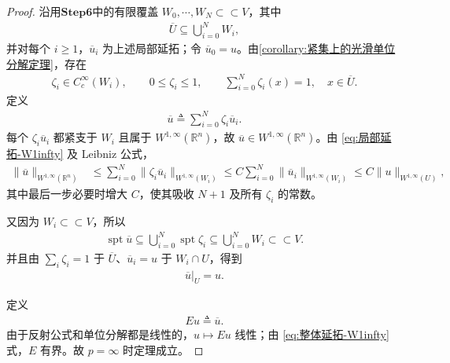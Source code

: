 \documentclass[../../main.tex]{subfiles}%
\begin{document}
\begin{proof}
沿用$\mathbf{Step 6}$中的有限覆盖 \(W_0,\cdots ,W_N\subset\subset V\)，其中
\begin{align*}
\overline U\subseteq\bigcup_{i=0}^N W_i,
\end{align*}
并对每个 \(i\geqslant1\)，\(\overline u_i\) 为上述局部延拓；令 \(\overline u_0=u\)。由\cref{corollary:紧集上的光滑单位分解定理}，存在
\begin{align*}
\zeta_i\in C_c^\infty(W_i),\qquad
0\leqslant\zeta_i\leqslant1,\qquad
\sum_{i=0}^N\zeta_i(x)=1,\quad x\in\overline U.
\end{align*}
定义
\begin{align*}
\overline u\triangleq\sum_{i=0}^N\zeta_i\overline u_i.
\end{align*}
每个 \(\zeta_i\overline u_i\) 都紧支于 \(W_i\) 且属于 \(W^{1,\infty}(\mathbb R^n)\)，故 \(\overline u\in W^{1,\infty}(\mathbb R^n)\)。由 \eqref{eq:局部延拓-W1infty} 及 Leibniz 公式，
\begin{align}
\|\overline u\|_{W^{1,\infty}(\mathbb R^n)}
&\leqslant\sum_{i=0}^N\|\zeta_i\overline u_i\|_{W^{1,\infty}(W_i)}
\leqslant C\sum_{i=0}^N\|\overline u_i\|_{W^{1,\infty}(W_i)}
\leqslant C\|u\|_{W^{1,\infty}(U)},
\label{eq:整体延拓-W1infty}
\end{align}
其中最后一步必要时增大 \(C\)，使其吸收 \(N+1\) 及所有 \(\zeta_i\) 的常数。

又因为 \(W_i\subset\subset V\)，所以
\begin{align*}
\operatorname{spt}\overline u
\subseteq\bigcup_{i=0}^N\operatorname{spt}\zeta_i
\subseteq\bigcup_{i=0}^N W_i
\subset\subset V.
\end{align*}
并且由 \(\sum_i\zeta_i=1\) 于 \(\overline U\)、\(\overline u_i=u\) 于 \(W_i\cap U\)，得到
\begin{align*}
\overline u|_U=u.
\end{align*}

定义
\begin{align*}
Eu\triangleq\overline u.
\end{align*}
由于反射公式和单位分解都是线性的，\(u\mapsto Eu\) 线性；由 \eqref{eq:整体延拓-W1infty}式，\(E\) 有界。故 \(p=\infty\) 时定理成立。
\end{proof}
\end{document}
